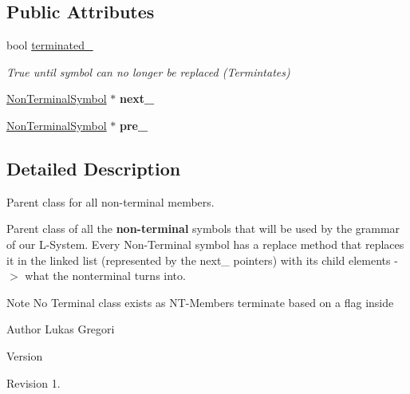 \subsection*{Public Attributes}
\begin{DoxyCompactItemize}
\item 
\hypertarget{class_non_terminal_symbol_afd45d7cf8c469a93dee6d1683162a78a}{}\label{class_non_terminal_symbol_afd45d7cf8c469a93dee6d1683162a78a} 
bool \hyperlink{class_non_terminal_symbol_afd45d7cf8c469a93dee6d1683162a78a}{terminated\+\_\+}
\begin{DoxyCompactList}\small\item\em True until symbol can no longer be replaced (Termintates) \end{DoxyCompactList}\item 
\hypertarget{class_non_terminal_symbol_a378de10e3a1b73efc005d1f86dc8dd3e}{}\label{class_non_terminal_symbol_a378de10e3a1b73efc005d1f86dc8dd3e} 
\hyperlink{class_non_terminal_symbol}{Non\+Terminal\+Symbol} $\ast$ {\bfseries next\+\_\+}
\item 
\hypertarget{class_non_terminal_symbol_a1365061b52c674fbbcfe7178584ce65e}{}\label{class_non_terminal_symbol_a1365061b52c674fbbcfe7178584ce65e} 
\hyperlink{class_non_terminal_symbol}{Non\+Terminal\+Symbol} $\ast$ {\bfseries pre\+\_\+}
\end{DoxyCompactItemize}


\subsection{Detailed Description}
Parent class for all non-\/terminal members. 

Parent class of all the {\bfseries non-\/terminal} symbols that will be used by the grammar of our L-\/\+System. Every Non-\/\+Terminal symbol has a replace method that replaces it in the linked list (represented by the next\+\_\+ pointers) with its child elements -\/$>$ what the nonterminal turns into.

\begin{DoxyNote}{Note}
No Terminal class exists as N\+T-\/\+Members terminate based on a flag inside
\end{DoxyNote}
\begin{DoxyAuthor}{Author}
Lukas Gregori 
\end{DoxyAuthor}
\begin{DoxyVersion}{Version}

\end{DoxyVersion}
\begin{DoxyParagraph}{Revision}
1. 
\end{DoxyParagraph}


